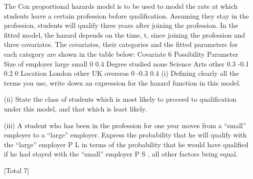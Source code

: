 \documentclass[a4paper,12pt]{article}
\begin{document}
The Cox proportional hazards model is to be used to model the rate at which students
leave a certain profession before qualification. Assuming they stay in the profession,
students will qualify three years after joining the profession. In the fitted model, the
hazard depends on the time, t, since joining the profession and three covariates. The
covariates, their categories and the fitted parameters for each category are shown in
the table below:
Covariate
6
Possibility
Parameter
Size of employer large
small
0
0.4
Degree studied none
Science
Arts
other 0.3
-0.1
0.2
0
Location London
other UK
overseas 0
-0.3
0.4
(i) Defining clearly all the terms you use, write down an expression for the hazard
function in this model.

(ii) State the class of students which is most likely to proceed to qualification
under this model, and that which is least likely.

(iii) A student who has been in the profession for one year moves from a “small”
employer to a “large” employer. Express the probability that he will qualify
with the “large” employer P L in terms of the probability that he would have
qualified if he had stayed with the “small” employer P S , all other factors being
equal.

[Total 7]%
\end{document}

